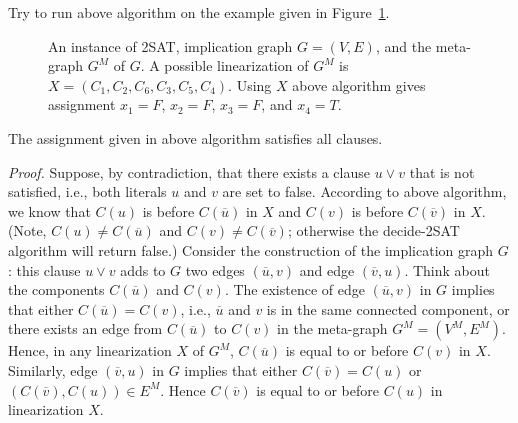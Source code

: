 \begin{minipage}{0.8\textwidth}
	\xxx
	\xxx
	\xxx
	\xxx
	\xxx
	\xxx
	\xxx
	\xxx
	\xxx
\end{minipage}

Try to run above algorithm on the example given in Figure~\ref{fig:instance2}.

\begin{figure}[h!]
\centering{}
\caption{An instance of 2SAT, implication graph $G = (V, E)$, and the meta-graph $G^M$ of $G$. 
A possible linearization of $G^M$ is $X = (C_1, C_2, C_6, C_3, C_5, C_4)$.
Using $X$ above algorithm gives assignment $x_1 = F$, $x_2 = F$, $x_3 = F$, and $x_4 = T$.}
\label{fig:instance2}
\end{figure}

\begin{claim}
The assignment given in above algorithm satisfies all clauses.
\end{claim}

\emph{Proof.} Suppose, by contradiction, that there exists a clause $u\vee v$ that is not satisfied,
i.e., both literals $u$ and $v$ are set to false.
According to above algorithm, we know that 
$C(u)$ is before $C(\overline{u})$ in $X$
and $C(v)$ is before $C(\overline{v})$ in $X$.
(Note, $C(u) \neq C(\overline{u})$ and $C(v) \neq C(\overline{v})$; otherwise the decide-2SAT algorithm will return false.)
Consider the construction of the implication graph $G$:
this clause $u\vee v$ adds to $G$ two edges $(\overline{u}, v)$ and edge $(\overline{v}, u)$.
Think about the components $C(\overline{u})$ and $C(v)$.
The existence of edge $(\overline{u}, v)$ in $G$ implies that 
either $C(\overline{u}) = C(v)$, i.e., $\overline{u}$ and $v$ is in the same connected component,
or there exists an edge from $C(\overline{u})$ to $C(v)$ in the meta-graph $G^M = (V^M, E^M)$.
Hence, in any linearization $X$ of $G^M$, $C(\overline{u})$ is equal to or before $C(v)$ in $X$.
Similarly, edge $(\overline{v}, u)$ in $G$ implies that 
either $C(\overline{v}) = C(u)$ or $(C(\overline{v}), C(u))\in E^M$.
Hence $C(\overline{v})$ is equal to or before $C(u)$ in linearization $X$.


